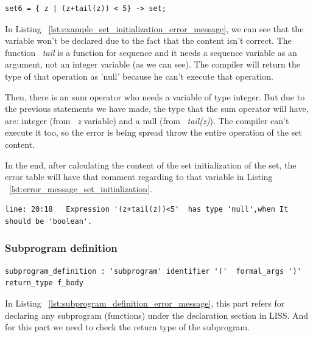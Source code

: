 \documentclass[
  oneside,
  11pt, a4paper,
  footinclude=true,
  headinclude=true,
  cleardoublepage=empty
]{scrbook}
\begin{document}
\begin{lstlisting}[label={lst:example_set_initialization_error_message},caption={Example of an error message in LISS for set\_initialization non-terminal}]
  set6 = { z | (z+tail(z)) < 5} -> set;
\end{lstlisting}

In Listing ~\ref{lst:example_set_initialization_error_message}, we can see that the variable won't be declared due to the fact that the content isn't correct. The function ~\textit{tail} is a function for sequence and it needs a sequence variable as an argument, not an integer variable (as we can see). The compiler will return the type of that operation as 'null' because he can't execute that operation.

Then, there is an sum operator who needs a variable of type integer. But due to the previous statements we have made, the type that the sum operator will have, are: integer (from ~\textit{z} variable) and a null (from ~\textit{tail(z)}). 
The compiler can't execute it too, so the error is being spread throw the entire operation of the set content.

In the end, after calculating the content of the set initialization of the set, the error table will have that comment regarding to that variable in Listing ~\ref{lst:error_message_set_initialization}.

\begin{lstlisting}[label={lst:error_message_set_initialization},caption={Error message for the set\_initialization}]
  line: 20:18	Expression '(z+tail(z))<5'  has type 'null',when It should be 'boolean'.
\end{lstlisting}

\subsubsection{Subprogram definition}

\begin{lstlisting}[label={lst:subprogram_definition_error_message},caption={Subprogram definition rule in LISS}]
  subprogram_definition : 'subprogram' identifier '('  formal_args ')' return_type f_body
\end{lstlisting}

In Listing ~\ref{lst:subprogram_definition_error_message}, this part refers for declaring any subprogram (functions) under the declaration section in LISS.
And for this part we need to check the return type of the subprogram.
\end{document}
